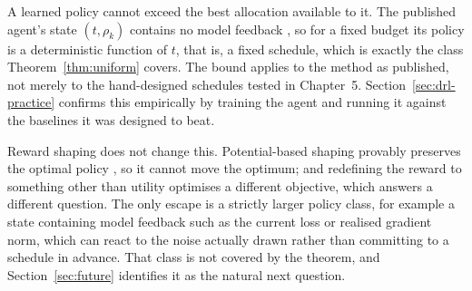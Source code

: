 A learned policy cannot exceed the best allocation available to it. The
published agent's state $(t,\rho_k)$ contains no model feedback
\cite{ChenAdaptivePrivacyMARL}, so for a fixed budget its policy is a
deterministic function of $t$, that is, a fixed schedule, which is exactly the
class Theorem~\ref{thm:uniform} covers. The bound applies to the method as
published, not merely to the hand-designed schedules tested in
Chapter~5. Section~\ref{sec:drl-practice} confirms this empirically by training
the agent and running it against the baselines it was designed to beat.

\vspace{10pt}

Reward shaping does not change this. Potential-based shaping provably preserves
the optimal policy \cite{ng1999policy}, so it cannot move the optimum; and
redefining the reward to something other than utility optimises a different
objective, which answers a different question. The only escape is a strictly
larger policy class, for example a state containing model feedback such as the
current loss or realised gradient norm, which can react to the noise actually
drawn rather than committing to a schedule in advance. That class is not covered
by the theorem, and Section~\ref{sec:future} identifies it as the natural next
question.
